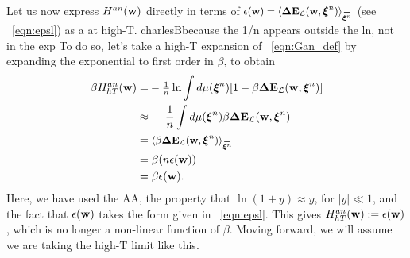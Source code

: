

Let us now express $H^{an}({\mathbf{w}})$ directly in terms of $\EPSLw=\langle\DETOPXI \rangle_{\AVGNDXIn}$ (see \EQN~\ref{eqn:epsl}) as a \ThermalAverage at high-T.
charlesB{because the 1/n appears outside the ln, not in the exp}
To do so, let's take a high-T expansion of \EQN~\ref{eqn:Gan_def} 
by expanding the exponential to first order in $\beta$, to obtain
\begin{align}
\label{eqn:Gan_highT}
\beta\GANHT
=&  - \tfrac{1}{n}\ln \int d\mu(\NDXIn) [1-\beta \DETOPXI] \\ \nonumber
\approx&\;   - \frac{1}{n} \int d\mu(\NDXIn)\beta \DETOPXI \\ \nonumber
=&\;\langle \beta\DETOPXI \rangle_{\AVGNDXIn} \\ \nonumber
=&\;\beta (n\EPSLw)\\ 
\label{eqn:Gan_highT_final}
=&\;\beta \EPSLw  .
\end{align}
Here, we have used the AA, the property that $\ln(1 + y) \approx y$, for $|y| \ll 1$, and the fact that $\epsilon({\mathbf{w}})$ takes the form given in \EQN~\ref{eqn:epsl}.
This gives $H^{an}_{hT}({\mathbf{w}}):=\epsilon({\mathbf{w}})$, which is no longer a non-linear function of $\beta$.
Moving forward, we will assume we are taking the high-T limit like this.

